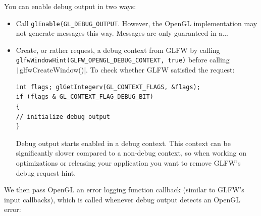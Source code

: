 \documentclass[table, xcdraw]{article}%
\begin{document}
You can enable debug output in two ways:
\begin{itemize}
    \item Call \texttt{glEnable(GL_DEBUG_OUTPUT}. However, the OpenGL implementation may not generate messages this way. Messages are only guaranteed in a...
    \item Create, or rather request, a debug context from GLFW by calling \texttt{glfwWindowHint(GLFW_OPENGL_DEBUG_CONTEXT, true)} before calling \texttt|glfwCreateWindow()|. To check whether GLFW satisfied the request:
    
    \begin{verbatim}
int flags; glGetIntegerv(GL_CONTEXT_FLAGS, &flags);
if (flags & GL_CONTEXT_FLAG_DEBUG_BIT)
{
// initialize debug output
}
    \end{verbatim}
    
    Debug output starts enabled in a debug context. This context can be significantly slower compared to a non-debug context, so when working on optimizations or releasing your application you want to remove GLFW's debug request hint.
\end{itemize}

We then pass OpenGL an error logging function callback (similar to GLFW's input callbacks), which is called whenever debug output detects an OpenGL error:
\end{document}
